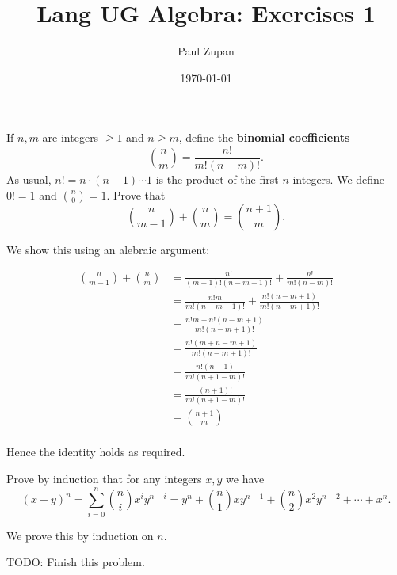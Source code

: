 \documentclass{zupan}
\title{Lang UG Algebra: Exercises 1}
\author{Paul Zupan}
\date{\today}
\begin{document}
\maketitle

\begin{exercise}{1}
  If $n, m$ are integers $\geq 1$ and $n \geq m$, define the \textbf{binomial
  coefficients} \[\binom{n}{m} = \frac{n!}{m!(n - m)!}.\] As usual, $n! = n
  \cdot (n - 1) \cdots 1$ is the product of the first $n$ integers. We define
  $0! = 1$ and $\binom{n}{0} = 1$. Prove that \[\binom{n}{m - 1} + \binom{n}{m}
  = \binom{n + 1}{m}.\]
\end{exercise}

\begin{solution}
  We show this using an alebraic argument:

  \[
    \begin{aligned}
      \binom{n}{m - 1} + \binom{n}{m}
        & = \frac{n!}{(m - 1)!(n - m + 1)!} + \frac{n!}{m!(n - m)!} \\
        & = \frac{n!m}{m!(n - m + 1)!} + \frac{n!(n - m + 1)}{m!(n - m + 1)!} \\
        & = \frac{n!m + n!(n - m + 1)}{m!(n - m + 1)!} \\
        & = \frac{n!(m + n - m + 1)}{m!(n - m + 1)!} \\
        & = \frac{n!(n + 1)}{m!(n + 1 - m)!} \\
        & = \frac{(n + 1)!}{m!(n + 1 - m)!} \\
        & = \binom{n + 1}{m} \\
    \end{aligned}
  \]

  Hence the identity holds as required.
\end{solution}

\begin{exercise}{2}
  Prove by induction that for any integers $x, y$ we have \[(x + y)^n = \sum_{i
  = 0}^n \binom{n}{i} x^iy^{n - i} = y^n + \binom{n}{1}xy^{n - 1} +
  \binom{n}{2}x^2y^{n - 2} + \cdots + x^n.\]
\end{exercise}

\begin{solution}
  We prove this by induction on $n$.

  TODO: Finish this problem.
\end{solution}
\end{document}
